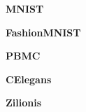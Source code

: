 \documentclass[10pt]{article}
\begin{document}
\begin{sidewaystable}
\begin{center}
	\textbf{MNIST}

	\textbf{FashionMNIST}

	\textbf{PBMC}

	\textbf{CElegans}

	\textbf{Zilionis}

\end{center}
\end{sidewaystable}
\end{document}
